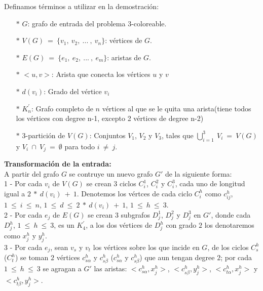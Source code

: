 \documentclass{article}
\begin{document}
Definamos t\'erminos a utilizar en la demostraci\'on: 
\begin{itemize}
    \item[$\ast $] $G$: grafo de entrada del problema 3-coloreable.
    \item[$\ast $] $V(G)~ = ~\{v_1,~ v_2,~ ... ~, ~v_n\}$: v\'ertices de $G$.
    \item[$\ast $] $E(G)~ = ~\{e_1, ~e_2,~ ...~ ,~ e_m\}$: aristas de $G$.
    \item[$\ast $] $<u,v>$: Arista que conecta los v\'ertices $u$ y $v$
    \item[$\ast $] $d(v_i)$: Grado del v\'ertice $v_i$
    \item[$\ast $] $K^{'}_n$: Grafo completo de $n$ v\'ertices al que se le quita una arista(tiene todos los v\'ertices con degree n-1, excepto 2 v\'ertices de degree n-2)
    \item[$\ast $] $3$-partici\'on de $V(G)$: Conjuntos $V_1$, $V_2$ y $V_3$, tales que $\bigcup_{i=1}^{3} ~V_i~ = ~V(G)$  y $V_i ~\cap~ V_j~ =~ \emptyset$ para todo $i~ \neq~ j$.
\end{itemize}

\textbf{Transformaci\'on de la entrada:}\\

A partir del grafo $G$ se contruye un nuevo grafo $G'$ de la siguiente forma:\\ 

1 - Por cada $v_i$ de $V(G)$ se crean $3$ ciclos $C_i^1$, $C_i^2$ y $C_i^3$, cada uno de longitud igual a $2 ~*~ d(v_i)~ + ~1$. Denotemos 
los v\'ertces de cada ciclo $C_i^h$ como $c_{ij}^h$, $1~ \leq~i~\leq ~n$, $1~ \leq~d~\leq ~2 ~*~ d(v_i)~ + ~1$, $1~ \leq~h~\leq ~3$.\\ 

2 - Por cada $e_j$ de $E(G)$ se crean $3$ subgrafos $D_{j}^1$, $D_{j}^2$ y $D_{j}^3$ en $G'$, donde cada $D_{j}^h$, $1~ \leq~h~\leq ~3$,  es un $K^{'}_4$, a los dos v\'ertices 
de $D_{j}^h$ con grado $2$ los denotaremos como $x_{j}^h$ y $y_{j}^h$.\\

3 - Por cada $e_j$, sean $v_s$ y $v_t$ los v\'ertices sobre los que incide en $G$, de los ciclos $C_s^h$ ($C_t^h$) se toman $2$ v\'ertices 
$c_{s\alpha}^h$ y $c_{s\beta}^h$ ($c_{s\alpha}^h$ y $c_{s\beta}^h$) que aun tengan degree $2$; por cada $1~\leq ~h ~\leq~ 3$ se agragan a $G'$ las aristas: $<c_{s\alpha}^h, x_{j}^h>$, $<c_{s\beta}^h, y_{j}^h>$, 
$<c_{t\alpha}^h, x_{j}^h>$ y $<c_{t\beta}^h, y_{j}^h>$.\\ 
\end{document}
